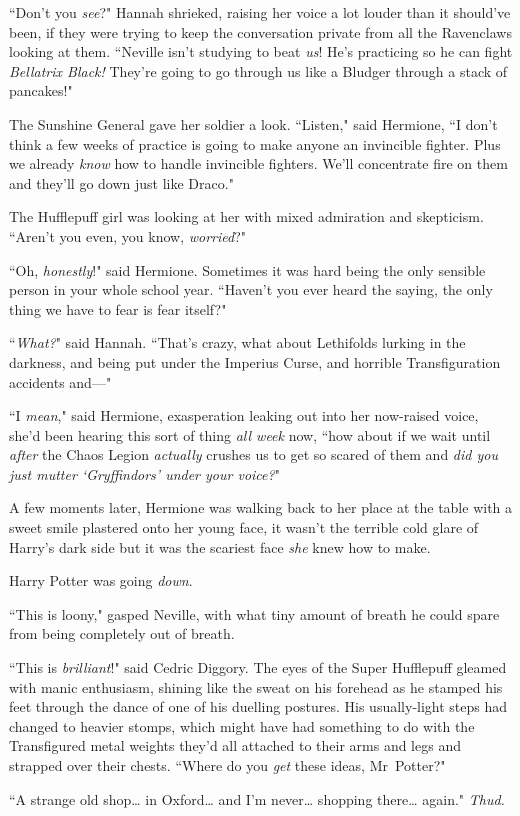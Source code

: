 ``Don't you \emph{see}?" Hannah shrieked, raising her voice a lot louder than it should've been, if they were trying to keep the conversation private from all the Ravenclaws looking at them. ``Neville isn't studying to beat \emph{us}! He's practicing so he can fight \emph{Bellatrix Black!} They're going to go through us like a Bludger through a stack of pancakes!"

The Sunshine General gave her soldier a look. ``Listen," said Hermione, ``I don't think a few weeks of practice is going to make anyone an invincible fighter. Plus we already \emph{know} how to handle invincible fighters. We'll concentrate fire on them and they'll go down just like Draco."

The Hufflepuff girl was looking at her with mixed admiration and skepticism. ``Aren't you even, you know, \emph{worried}?"

``Oh, \emph{honestly}!" said Hermione. Sometimes it was hard being the only sensible person in your whole school year. ``Haven't you ever heard the saying, the only thing we have to fear is fear itself?"

``\emph{What?}" said Hannah. ``That's crazy, what about Lethifolds lurking in the darkness, and being put under the Imperius Curse, and horrible Transfiguration accidents and—"

``I \emph{mean}," said Hermione, exasperation leaking out into her now-raised voice, she'd been hearing this sort of thing \emph{all week} now, ``how about if we wait until \emph{after} the Chaos Legion \emph{actually} crushes us to get so scared of them and \emph{did you just mutter `Gryffindors' under your voice?}"

A few moments later, Hermione was walking back to her place at the table with a sweet smile plastered onto her young face, it wasn't the terrible cold glare of Harry's dark side but it was the scariest face \emph{she} knew how to make.

Harry Potter was going \emph{down}.

\later

``This is loony," gasped Neville, with what tiny amount of breath he could spare from being completely out of breath.

``This is \emph{brilliant}!" said Cedric Diggory. The eyes of the Super Hufflepuff gleamed with manic enthusiasm, shining like the sweat on his forehead as he stamped his feet through the dance of one of his duelling postures. His usually-light steps had changed to heavier stomps, which might have had something to do with the Transfigured metal weights they'd all attached to their arms and legs and strapped over their chests. ``Where do you \emph{get} these ideas, Mr~Potter?"

``A strange old shop{\ldots} in Oxford{\ldots} and I'm never{\ldots} shopping there{\ldots} again." \emph{Thud.}

